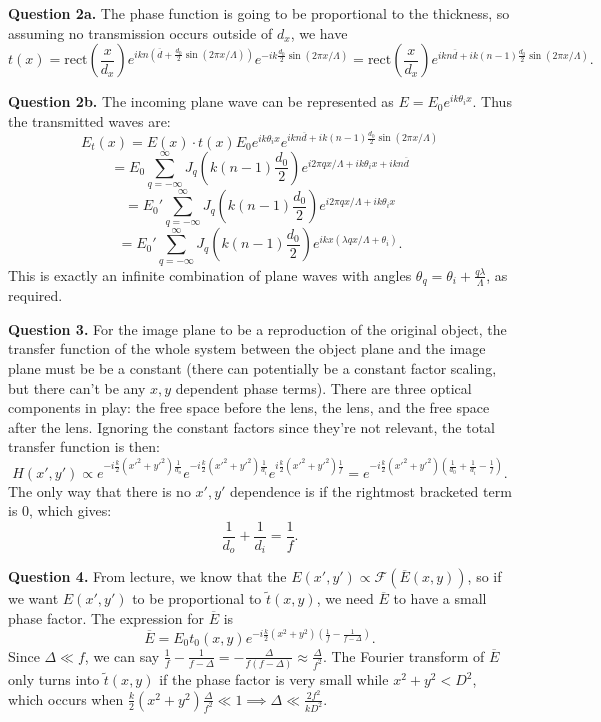 \documentclass[letterpaper, reqno,11pt]{article}
\begin{document}
{\medskip\noindent\bf Question 2a.} The phase function is going to be proportional to the thickness, so assuming no transmission occurs outside of $d_x$, we have
\[
t(x) = \text{rect}\left(\frac{x}{d_x}\right)e^{ikn\left(\overline{d}+\frac{d_0}{2}\sin(2\pi x /\Lambda)\right)}e^{-ik \frac{d_0}{2}\sin\left( 2\pi x /\Lambda \right) }=\text{rect}\left(\frac{x}{d_x}\right)e^{ikn\overline{d}+ik(n-1)\frac{d_0}{2}\sin(2\pi x /\Lambda)}
.\]

{\medskip\noindent\bf Question 2b.} The incoming plane wave can be represented as $E=E_0 e^{ik\theta_i x}$. Thus the transmitted waves are:
\[
E_t(x)=E(x)\cdot t(x)E_0 e^{ik\theta_i x} e^{ikn\overline{d}+ik(n-1)\frac{d_0}{2}\sin(2\pi x /\Lambda)}
\]
\[
=E_0\sum_{q=-\infty}^{\infty}J_q\left(k(n-1) \frac{d_0}{2}\right)e^{i 2\pi qx /\Lambda+ik\theta_ix+ikn\overline{d}}
\]
\[
=E_0'\sum_{q=-\infty}^{\infty}J_q\left(k(n-1) \frac{d_0}{2}\right)e^{i 2\pi qx /\Lambda+ik\theta_ix} 
\]
\[
=E_0'\sum_{q=-\infty}^{\infty}J_q\left(k(n-1) \frac{d_0}{2}\right)e^{ikx(\lambda qx /\Lambda+\theta_i)} 
.\]
This is exactly an infinite combination of plane waves with angles $\theta_q=\theta_i+\frac{q\lambda}{\Lambda}$, as required.

{\medskip\noindent\bf Question 3.} For the image plane to be a reproduction of the original object, the transfer function of the whole system between the object plane and the image plane must be be a constant (there can potentially be a constant factor scaling, but there can't be any $x,y$ dependent phase terms). There are three optical components in play: the free space before the lens, the lens, and the free space after the lens. Ignoring the constant factors since they're not relevant, the total transfer function is then:
\[
    H(x',y')\propto e^{-i \frac{k}{2}(x'^2+y'^2) \frac{1}{d_o}}e^{-i \frac{k}{2}(x'^2+y'^2) \frac{1}{d_i}}e^{i \frac{k}{2}(x'^2+y'^2) \frac{1}{f}}=e^{-i \frac{k}{2}(x'^2+y'^2)\left( \frac{1}{d_0}+\frac{1}{d_i}-\frac{1}{f} \right) }
.\]
The only way that there is no $x',y'$ dependence is if the rightmost bracketed term is 0, which gives:
\[
\frac{1}{d_o}+\frac{1}{d_i}=\frac{1}{f}
.\]

{\medskip\noindent\bf Question 4.} From lecture, we know that the $E(x',y')\propto \mathcal F(\overline{E}(x,y))$, so if we want $E(x',y')$ to be proportional to $\tilde t(x,y)$, we need $\overline{E}$ to have a small phase factor. The expression for $\overline{E}$ is
\[
\overline{E}=E_0 t_0(x,y) e^{-i \frac{k}{2}(x^2+y^2)\left( \frac{1}{f}-\frac{1}{f-\Delta} \right) }
.\]
Since $\Delta \ll f$, we can say $\frac{1}{f}-\frac{1}{f-\Delta}= -\frac{\Delta}{f(f-\Delta)}\approx \frac{\Delta}{f^2}$. The Fourier transform of $\overline{E}$ only turns into $\tilde t(x,y)$ if the phase factor is very small while $x^2+y^2<D^2$, which occurs when $\frac{k}{2}(x^2+y^2) \frac{\Delta}{f^2}\ll 1\implies \Delta \ll \frac{2f^2}{kD^2}$.
\end{document}
